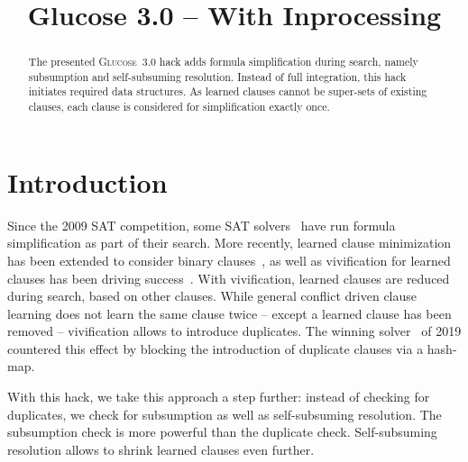 \documentclass[conference]{IEEEtran}
\begin{document}
	
\title{Glucose 3.0 -- With Inprocessing}

\author{
}

\maketitle

\def\coprocessor{\textsc{Coprocessor}\xspace}
\def\glucose{\textsc{Glucose~3.0}\xspace}
\def\minisat{\textsc{Minisat~2.2}\xspace}
\def\riss{\textsc{Riss}\xspace}
\def\mergesat{\textsc{MergeSAT}\xspace}

\begin{abstract}
The presented \glucose hack adds formula simplification during search, namely subsumption and self-subsuming resolution.
Instead of full integration, this hack initiates required data structures.
As learned clauses cannot be super-sets of existing clauses, each clause is considered for simplification exactly once.
\end{abstract}

\section{Introduction}

Since the 2009 SAT competition, some SAT solvers~\cite{precosat} have run formula simplification as part of their search.
More recently, learned clause minimization has been extended to consider binary clauses~\cite{glucose}, as well as vivification for learned clauses has been driving success~\cite{riss5,lcm-ijcai2017}.
With vivification, learned clauses are reduced during search, based on other clauses.
While general conflict driven clause learning does not learn the same clause twice -- except a learned clause has been removed -- vivification allows to introduce duplicates.
The winning solver~\cite{MapleLCMDistChronoBTDL} of 2019 countered this effect by blocking the introduction of duplicate clauses via a hash-map.

With this hack, we take this approach a step further: instead of checking for duplicates, we check for subsumption as well as self-subsuming resolution.
The subsumption check is more powerful than the duplicate check.
Self-subsuming resolution allows to shrink learned clauses even further.
\end{document}
